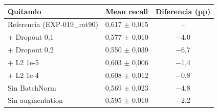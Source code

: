 \begin{tabular}{lcc}
\toprule
Quitando & Mean recall & Diferencia (pp) \\
\midrule
Referencia (EXP-019\_rot90) & 0,617 $\pm$ 0,015 & -- \\
+ Dropout 0,1 & 0,577 $\pm$ 0,010 & $-$4,0 \\
+ Dropout 0,2 & 0,550 $\pm$ 0,039 & $-$6,7 \\
+ L2 1e-5 & 0,603 $\pm$ 0,006 & $-$1,4 \\
+ L2 1e-4 & 0,608 $\pm$ 0,012 & $-$0,8 \\
Sin BatchNorm & 0,569 $\pm$ 0,023 & $-$4,8 \\
Sin augmentation & 0,595 $\pm$ 0,010 & $-$2,2 \\
\bottomrule
\end{tabular}
